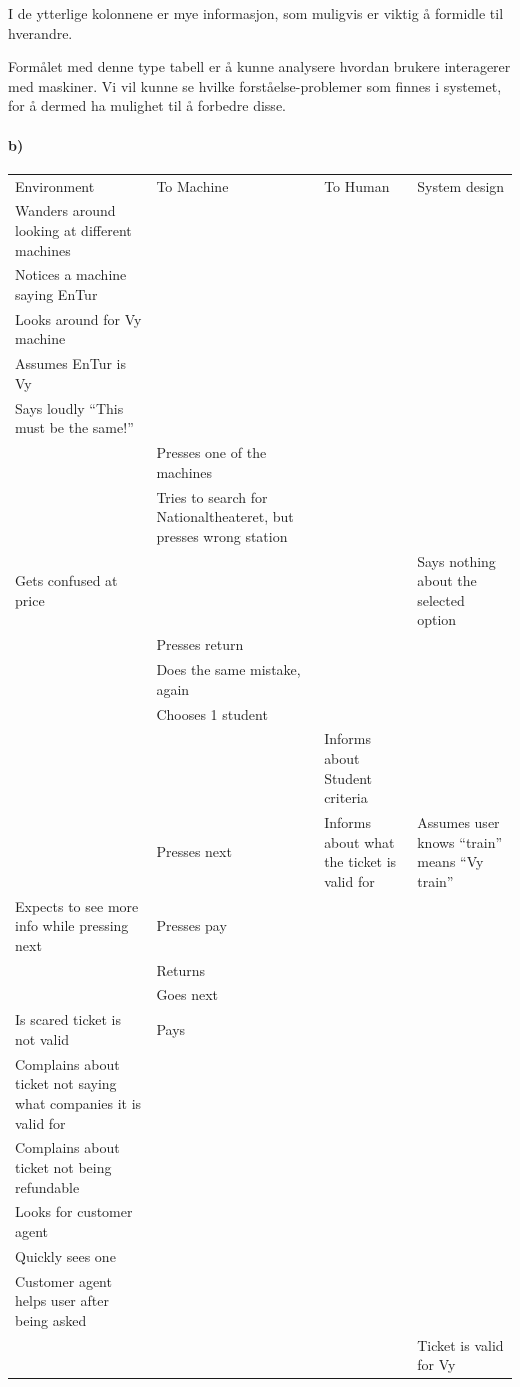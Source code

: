 \documentclass{../../myassignment}
\begin{document}
	I de ytterlige kolonnene er mye informasjon, som muligvis er viktig {\aa} formidle til hverandre.

	Form{\aa}let med denne type tabell er \aa{} kunne analysere hvordan brukere interagerer med maskiner. Vi vil kunne se hvilke forst{\aa}else-problemer som finnes i systemet, for {\aa} dermed ha mulighet til {\aa} forbedre disse.

	\newpage

	\paragraph*{b)}  %

	\begin{tabular}{ | >{\centering}p{10em} || >{\raggedleft}p{10em} | >{\raggedright}p{10em} || >{\centering\arraybackslash}p{10em} | }
	\hline
	\multicolumn{2}{|c|}{Human} & \multicolumn{2}{c|}{Machine} \\\hline
	Environment & {To Machine} & To Human & System design\\\hline\hline
	Wanders around looking at different machines & & & \\\hline
	Notices a machine saying EnTur &  & & \\\hline
	Looks around for Vy machine &  & & \\\hline
	Assumes EnTur is Vy &  & & \\\hline
	Says loudly ``This must be the same!'' &  & & \\\hline
	 & Presses one of the machines & & \\\hline
	 & Tries to search for Nationaltheateret, but presses wrong station & & \\\hline
	Gets confused at price & & & Says nothing about the selected option\\\hline
	 & Presses return & & \\\hline
	 & Does the same mistake, again & & \\\hline
	 & Chooses 1 student & & \\\hline
	 &  & Informs about Student criteria & \\\hline
	 & Presses next & Informs about what the ticket is valid for & Assumes user knows ``train'' means ``Vy train'' \\\hline
	Expects to see more info while pressing next & Presses pay & & \\\hline
	 & Returns & & \\\hline
	 & Goes next & & \\\hline
	Is scared ticket is not valid & Pays & & \\\hline
	Complains about ticket not saying what companies it is valid for &  & & \\\hline
	Complains about ticket not being refundable &  & & \\\hline
	Looks for customer agent &  & & \\\hline
	Quickly sees one &  & & \\\hline
	Customer agent helps user after being asked &  & & \\\hline
	& & & Ticket is valid for Vy \\\hline
	\end{tabular}
\end{document}
